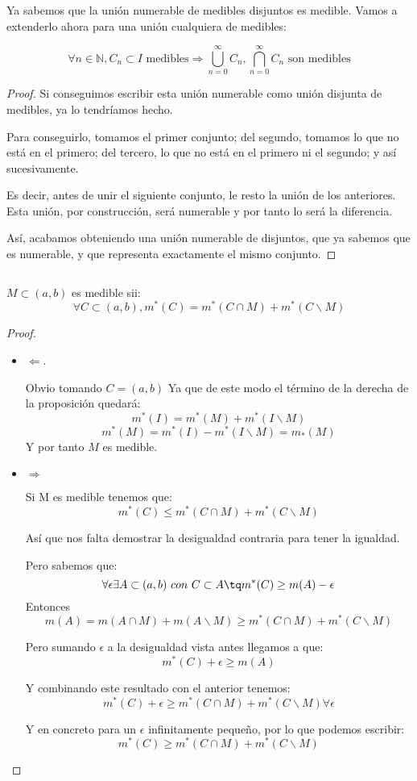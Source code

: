 \documentclass{apuntes}
\begin{document}
Ya sabemos que la unión numerable de medibles disjuntos es medible. Vamos a extenderlo ahora para una unión cualquiera de medibles:

\begin{prop}
\[ \forall n \in \mathbb{N}, C_n \subset I \text{  medibles} \Rightarrow \bigcup_{n=0}^{\infty} C_n, \bigcap_{n=0}^{\infty} C_n  \text{ son medibles} \]
\end{prop}
\begin{proof}
Si conseguimos escribir esta unión numerable como unión disjunta de medibles, ya lo tendríamos hecho.

Para conseguirlo, tomamos el primer conjunto; del segundo, tomamos lo que no está en el primero; del tercero, lo que no está en el primero ni el segundo; y así sucesivamente.

Es decir, antes de unir el siguiente conjunto, le resto la unión de los anteriores. Esta unión, por construcción, será numerable y por tanto lo será la diferencia.

Así, acabamos obteniendo una unión numerable de disjuntos, que ya sabemos que es numerable, y que representa exactamente el mismo conjunto.
\end{proof}

\begin{prop}[Caratheodory] $ $ %

$M \subset (a,b)$  es medible sii:
\[ \forall C \subset (a,b), m^*(C)=m^*(C\cap M)+m^*(C \smallsetminus M) \]
\end{prop}
\begin{proof}
\begin{itemize}
\item $\Leftarrow$.

Obvio tomando $C=(a,b)$
Ya que de este modo el término de la derecha de la proposición quedará:
\[m^*(I) = m^*(M) + m^*(I \smallsetminus M)\]
\[m^*(M) = m^*(I) - m^*(I \smallsetminus M) = m_*(M)\]
Y por tanto $M$ es medible.

\item $\Rightarrow$

Si M es medible tenemos que:
\[m^*(C) \leq m^*(C\cap M)+m^*(C \smallsetminus M)\]

Así que nos falta demostrar la desigualdad contraria para tener la igualdad.

Pero sabemos que:
\[\forall \epsilon \exists A \subset (a,b) \ con \ C \subset A \tq m^*(C) \geq m(A)-\epsilon\]
Entonces
\[m(A)=m(A\cap M) + m (A \smallsetminus M) \geq m^*(C \cap M) + m^*(C\smallsetminus M)\]

Pero sumando $\epsilon$ a la desigualdad vista antes llegamos a que:
\[m^*(C) + \epsilon \geq m(A)\]

Y combinando este resultado con el anterior tenemos:
\[m^*(C) + \epsilon \geq m^*(C \cap M) + m^*(C\smallsetminus M) \forall \epsilon\]

Y en concreto para un $\epsilon$ infinitamente pequeño, por lo que podemos escribir:
\[m^*(C) \geq m^*(C \cap M) + m^*(C\smallsetminus M)\]

\end{itemize}
\end{proof}
\end{document}
